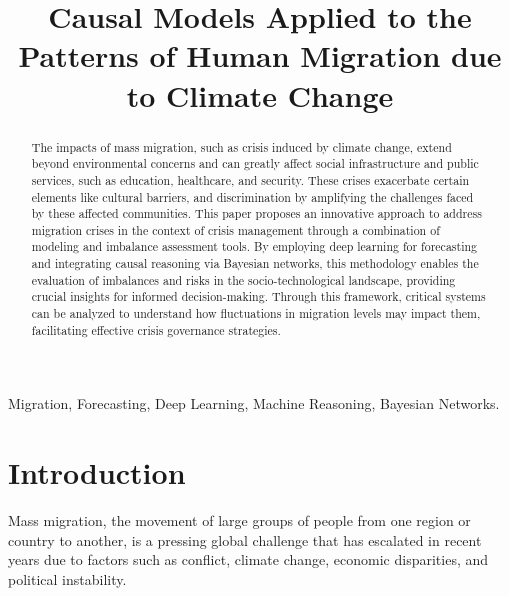 \documentclass[conference]{IEEEtran}
\begin{document}
	
	\title{Causal Models Applied to the Patterns of Human Migration due to Climate Change}
	
	\author{
	}	
	
	
	\maketitle
	
	\begin{abstract}
		The impacts of mass migration, such as crisis induced by climate change, extend beyond environmental concerns and can greatly affect social infrastructure and public services, such as education, healthcare, and security. These crises exacerbate certain elements like cultural barriers, and discrimination by amplifying the challenges faced by these affected communities. This paper proposes an innovative approach to address migration crises in the context of crisis management through a combination of modeling and imbalance assessment tools. By employing deep learning for forecasting and integrating causal reasoning via Bayesian networks, this methodology enables the evaluation of imbalances and risks in the socio-technological landscape, providing crucial insights for informed decision-making. Through this framework, critical systems can be analyzed to understand how fluctuations in migration levels may impact them, facilitating effective crisis governance strategies.
	\end{abstract}
	
	\begin{IEEEkeywords}
		Migration, Forecasting, Deep Learning, Machine Reasoning, Bayesian Networks.
	\end{IEEEkeywords}
	
	\section{Introduction}
	Mass migration, the movement of large groups of people from one region or country to another, is a pressing global challenge that has escalated in recent years due to factors such as conflict, climate change, economic disparities, and political instability. 
	
\end{document}
